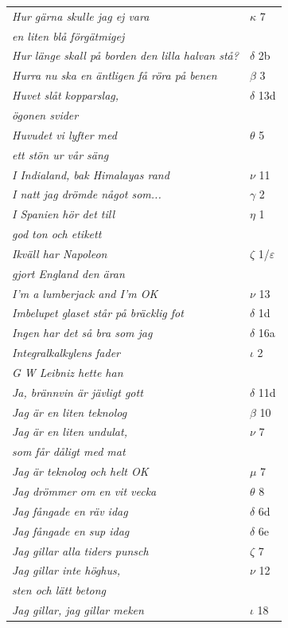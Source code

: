 \documentclass[a6paper,10pt]{article}
\begin{document}
\newpage
\begin{table}[!h]
\begin{tabular}{l l}
\textit{Hur gärna skulle jag ej vara}	&$\kappa$ 7\\
\textit{en liten blå förgätmigej} &\\
\textit{Hur länge skall på borden den lilla halvan stå?}	&$\delta$ 2b\\
\textit{Hurra nu ska en äntligen få röra på benen}	&$\beta$ 3\\
\textit{Huvet slåt kopparslag,}	&$\delta$ 13d\\
\textit{ögonen svider} &\\
\textit{Huvudet vi lyfter med}	&$\theta$ 5\\
\textit{ett stön ur vår säng} &\\
\textit{I Indialand, bak Himalayas rand}	&$\nu$ 11\\
\textit{I natt jag drömde något som...}	&$\gamma$ 2\\
\textit{I Spanien hör det till}	&$\eta$ 1\\
\textit{god ton och etikett} &\\
\textit{Ikväll har Napoleon}	&$\zeta$ 1/$\varepsilon$\\
\textit{gjort England den äran} &\\
\textit{I'm a lumberjack and I'm OK}	&$\nu$ 13\\
\textit{Imbelupet glaset står på bräcklig fot}	&$\delta$ 1d\\
\textit{Ingen har det så bra som jag}	&$\delta$ 16a\\
\textit{Integralkalkylens fader}	&$\iota$ 2\\
\textit{G W Leibniz hette han} &\\
\textit{Ja, brännvin är jävligt gott}	&$\delta$ 11d\\
\textit{Jag är en liten teknolog}	&$\beta$ 10\\
\textit{Jag är en liten undulat,}	&$\nu$ 7\\
\textit{som får dåligt med mat} &\\
\textit{Jag är teknolog och helt OK}	&$\mu$ 7\\
\textit{Jag drömmer om en vit vecka}	&$\theta$ 8\\
\textit{Jag fångade en räv idag}	&$\delta$ 6d\\
\textit{Jag fångade en sup idag}	&$\delta$ 6e\\
\textit{Jag gillar alla tiders punsch}	&$\zeta$ 7\\
\textit{Jag gillar inte höghus,}	&$\nu$ 12\\
\textit{sten och lätt betong} &\\
\textit{Jag gillar, jag gillar meken} &$\iota$ 18\\
\end{tabular}
\end{table}
\end{document}
